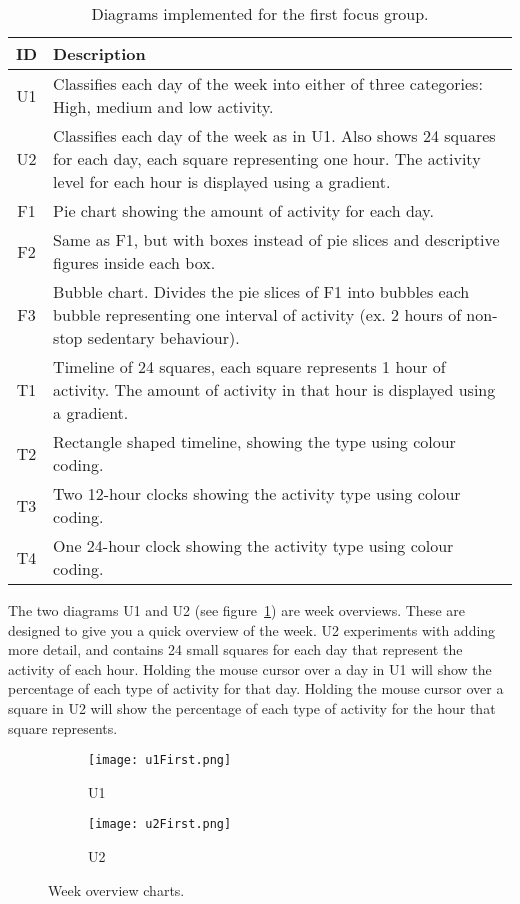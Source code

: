 \begin{table}[h!]
  \begin{center}
  \begin{tabular}{|c|p{10cm}|}
    \hline
    \textbf{ID} & \textbf{Description} \\ \hline
    U1 & Classifies each day of the week into either of three categories: High, medium and low activity. \\ \hline
    U2 & Classifies each day of the week as in U1. Also shows 24 squares for each day, each square representing one hour. The activity level for each hour is displayed using a gradient. \\ \hline
    F1 & Pie chart showing the amount of activity for each day. \\ \hline
    F2 & Same as F1, but with boxes instead of pie slices and descriptive figures inside each box. \\ \hline
    F3 & Bubble chart. Divides the pie slices of F1 into bubbles each bubble representing one interval of activity (ex. 2 hours of non-stop sedentary behaviour). \\ \hline
    T1 & Timeline of 24 squares, each square represents 1 hour of activity. The amount of activity in that hour is displayed using a gradient. \\ \hline
    T2 & Rectangle shaped timeline, showing the type using colour coding. \\ \hline
    T3 & Two 12-hour clocks showing the activity type using colour coding. \\ \hline
    T4 & One 24-hour clock showing the activity type using colour coding. \\ \hline
  \end{tabular}
  \end{center}
  \caption{Diagrams implemented for the first focus group.}
  \label{tab:runProtDesc1}
\end{table}

The two diagrams U1 and U2 (see figure~\ref{fig:uFirst}) are week overviews. These are designed to give you a quick overview of the week. U2 experiments with adding more detail, and contains 24 small squares for each day that represent the activity of each hour. Holding the mouse cursor over a day in U1 will show the percentage of each type of activity for that day. Holding the mouse cursor over a square in U2 will show the percentage of each type of activity for the hour that square represents.

\begin{figure}[h!]
  \centering
  \begin{subfigure}[b]{0.45\textwidth}
    \centering
    \texttt{[image: u1First.png]}
    \caption{U1}
  \end{subfigure}
  \begin{subfigure}[b]{0.45\textwidth}
    \centering
    \texttt{[image: u2First.png]}
    \caption{U2}
  \end{subfigure}
  \caption{Week overview charts.}
  \label{fig:uFirst}
\end{figure}

